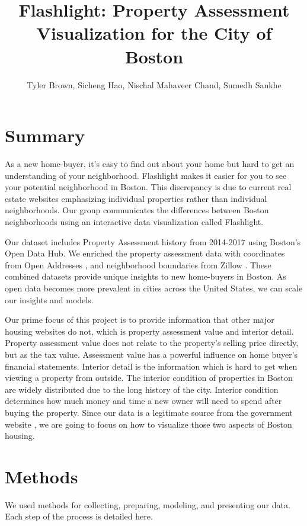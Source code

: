 \documentclass[12pt]{article}
\title{\textbf{Flashlight}: Property Assessment Visualization for the City of Boston}
\author{Tyler Brown, Sicheng Hao, Nischal Mahaveer Chand, Sumedh Sankhe}
\date{ }
\begin{document}
\maketitle

\section*{Summary}

As a new home-buyer, it's easy to find out about your home
but hard to get an understanding of your neighborhood. Flashlight
makes it easier for you to see your potential neighborhood in Boston.
This discrepancy is due to current real estate websites emphasizing
individual properties rather than individual neighborhoods. Our group
communicates the differences between Boston neighborhoods using an
interactive data visualization called Flashlight.

Our dataset includes Property Assessment history from 2014-2017
\cite{Property49:online} using Boston's Open Data Hub. We enriched the 
property assessment data with coordinates from Open Addresses
\cite{OpenAddr24:online}, and neighborhood boundaries from Zillow
\cite{ZillowNe81:online}. These combined datasets provide unique
insights to new home-buyers in Boston. As open data becomes more
prevalent in cities across the United States, we can scale our insights
and models.

Our prime focus of this project is to provide information that other 
major housing websites do not, which is property assessment value and 
interior detail. Property assessment value does not relate to the 
property's selling price directly, but as the tax value. Assessment value
 has a powerful influence on home buyer's financial statements. Interior 
 detail is the information which is hard to get when viewing a property
 from outside. The interior condition of properties in Boston are widely 
distributed due to the long history of the city. Interior condition 
determines how much money and time a new owner will need to spend after 
buying the property. Since our data is a legitimate source from the 
government website \cite{Property49:online}, we are going to focus on 
how to visualize those two aspects of Boston housing. 


\section*{Methods}

We used methods for collecting, preparing, modeling, and presenting
our data. Each step of the process is detailed here.
\end{document}
